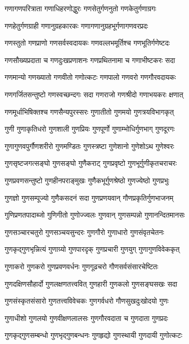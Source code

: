 \twolineshloka
{गणागणपरित्राता गणाधिहरणोद्धुरः}%
{गणसेतुर्गणनुतो गणकेतुर्गणाग्रगः}%

\twolineshloka
{गणहेतुर्गणग्राही गणानुग्रहकारकः}%
{गणागणानुग्रहभूर्गणागणवरप्रदः}%

\twolineshloka
{गणस्तुतो गणप्राणो गणसर्वस्वदायकः}%
{गणवल्लभमूर्तिश्च गणभूतिर्गणेष्टदः}%

\twolineshloka
{गणसौख्यप्रदाता च गणदुःखप्रणाशनः}%
{गणप्रथितनामा च गणाभीष्टकरः सदा}%

\twolineshloka
{गणमान्यो गणख्यातो गणवीतो गणोत्कटः}%
{गणपालो गणवरो गणगौरवदायकः}%

\twolineshloka
{गणगर्जितसन्तुष्टो गणस्वच्छन्दगः सदा}%
{गणराजो गणश्रीदो गणाभयकरः क्षणात्}%

\twolineshloka
{गणमूर्धाभिषिक्तश्च गणसैन्यपुरस्सरः}%
{गुणातीतो गुणमयो गुणत्रयविभागकृत्}%

\twolineshloka
{गुणी गुणाकृतिधरो गुणशाली गुणप्रियः}%
{गुणपूर्णो गुणाम्भोधिर्गुणभाग् गुणदूरगः}%

\twolineshloka
{गुणागुणवपुर्गौणशरीरो गुणमण्डितः}%
{गुणस्त्रष्टा गुणेशानो गुणेशोऽथ गुणेश्वरः}%

\twolineshloka
{गुणसृष्टजगत्सङ्घो गुणसङ्घो गुणैकराट्}%
{गुणप्रवृष्टो गुणभूर्गुणीकृतचराचरः}%

\twolineshloka
{गुणप्रवणसन्तुष्टो गुणहीनपराङ्मुखः}%
{गुणैकभूर्गुणश्रेष्ठो गुणज्येष्ठो गुणप्रभुः}%

\twolineshloka
{गुणज्ञो गुणसम्पूज्यो गुणैकसदनं सदा}%
{गुणप्रणयवान् गौणप्रकृतिर्गुणभाजनम्}%

\twolineshloka
{गुणिप्रणतपादाब्जो गुणिगीतो गुणोज्ज्वलः}%
{गुणवान् गुणसम्पन्नो गुणानन्दितमानसः}%

\twolineshloka
{गुणसञ्चारचतुरो गुणसञ्चयसुन्दरः}%
{गुणगौरो गुणाधारो गुणसंवृतचेतनः}%

\twolineshloka
{गुणकृद्गुणभृन्नित्यं गुणाग्र्यो गुणपारदृक्}%
{गुणप्रचारी गुणयुग् गुणागुणविवेककृत्}%

\twolineshloka
{गुणाकरो गुणकरो गुणप्रवणवर्धनः}%
{गुणगूढचरो गौणसर्वसंसारचेष्टितः}%

\twolineshloka
{गुणदक्षिणसौहार्दो गुणलक्षणतत्त्ववित्}%
{गुणहारी गुणकलो गुणसङ्घसखः सदा}%

\twolineshloka
{गुणसंस्कृतसंसारो गुणतत्त्वविवेचकः}%
{गुणगर्वधरो गौणसुखदुःखोदयो गुणः}%

\twolineshloka
{गुणाधीशो गुणलयो गुणवीक्षणलालसः}%
{गुणगौरवदाता च गुणदाता गुणप्रदः}%

\twolineshloka
{गुणकृद्गुणसम्बन्धो गुणभृद्गुणबन्धनः}%
{गुणहृद्यो गुणस्थायी गुणदायी गुणोत्कटः}%

